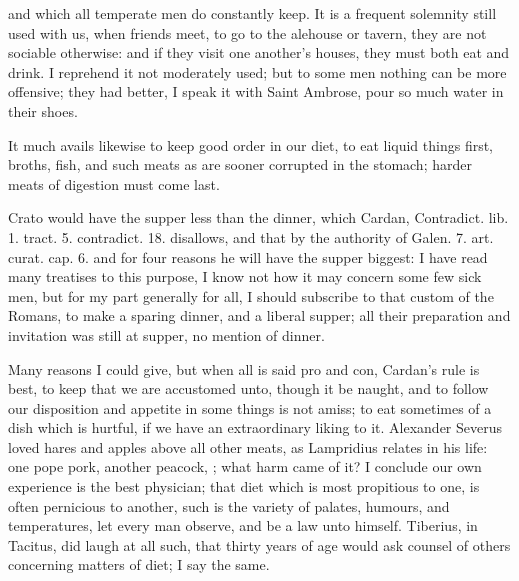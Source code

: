 {and which all temperate men do constantly keep. It is a frequent
solemnity still used with us, when friends meet, to go to the alehouse
or tavern, they are not sociable otherwise: and if they visit one
another's houses, they must both eat and drink. I reprehend it not
moderately used; but to some men nothing can be more offensive; they
had better, I speak it with Saint Ambrose, pour so much water in
their shoes.

It much avails likewise to keep good order in our diet, to eat
liquid things first, broths, fish, and such meats as are sooner
corrupted in the stomach; harder meats of digestion must come last.

Crato would have the supper less than the dinner, which Cardan,
Contradict. lib. 1. tract. 5. contradict. 18. disallows, and that by
the authority of Galen. 7. art. curat. cap. 6. and for four reasons he
will have the supper biggest: I have read many treatises to this
purpose, I know not how it may concern some few sick men, but for my
part generally for all, I should subscribe to that custom of the
Romans, to make a sparing dinner, and a liberal supper; all their
preparation and invitation was still at supper, no mention of dinner.

Many reasons I could give, but when all is said pro and con,
Cardan's rule is best, to keep that we are accustomed unto,
though it be naught, and to follow our disposition and appetite in some
things is not amiss; to eat sometimes of a dish which is hurtful, if we
have an extraordinary liking to it. Alexander Severus loved hares and
apples above all other meats, as Lampridius relates in his life:
one pope pork, another peacock, \etc{}; what harm came of it? I conclude
our own experience is the best physician; that diet which is most
propitious to one, is often pernicious to another, such is the variety
of palates, humours, and temperatures, let every man observe, and be a
law unto himself. Tiberius, in Tacitus, did laugh at all such,
that thirty years of age would ask counsel of others concerning matters
of diet; I say the same.

}
